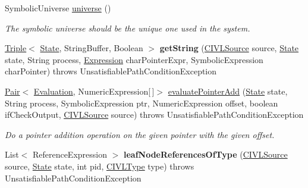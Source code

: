 \begin{DoxyCompactItemize}
Symbolic\+Universe \hyperlink{interfaceedu_1_1udel_1_1cis_1_1vsl_1_1civl_1_1semantics_1_1IF_1_1Evaluator_a0a9ac7185a439c0eb14ee08d6d9d1694}{universe} ()
\begin{DoxyCompactList}\small\item\em The symbolic universe should be the unique one used in the system. \end{DoxyCompactList}\item 
\hypertarget{interfaceedu_1_1udel_1_1cis_1_1vsl_1_1civl_1_1semantics_1_1IF_1_1Evaluator_a162e0e5ca97cb8387262320d948f6d7f}{}\hyperlink{classedu_1_1udel_1_1cis_1_1vsl_1_1civl_1_1util_1_1IF_1_1Triple}{Triple}$<$ \hyperlink{interfaceedu_1_1udel_1_1cis_1_1vsl_1_1civl_1_1state_1_1IF_1_1State}{State}, String\+Buffer, Boolean $>$ {\bfseries get\+String} (\hyperlink{interfaceedu_1_1udel_1_1cis_1_1vsl_1_1civl_1_1model_1_1IF_1_1CIVLSource}{C\+I\+V\+L\+Source} source, \hyperlink{interfaceedu_1_1udel_1_1cis_1_1vsl_1_1civl_1_1state_1_1IF_1_1State}{State} state, String process, \hyperlink{interfaceedu_1_1udel_1_1cis_1_1vsl_1_1civl_1_1model_1_1IF_1_1expression_1_1Expression}{Expression} char\+Pointer\+Expr, Symbolic\+Expression char\+Pointer)  throws Unsatisfiable\+Path\+Condition\+Exception\label{interfaceedu_1_1udel_1_1cis_1_1vsl_1_1civl_1_1semantics_1_1IF_1_1Evaluator_a162e0e5ca97cb8387262320d948f6d7f}

\item 
\hyperlink{classedu_1_1udel_1_1cis_1_1vsl_1_1civl_1_1util_1_1IF_1_1Pair}{Pair}$<$ \hyperlink{classedu_1_1udel_1_1cis_1_1vsl_1_1civl_1_1semantics_1_1IF_1_1Evaluation}{Evaluation}, Numeric\+Expression\mbox{[}$\,$\mbox{]}$>$ \hyperlink{interfaceedu_1_1udel_1_1cis_1_1vsl_1_1civl_1_1semantics_1_1IF_1_1Evaluator_a472056af07db8c828ad7a65de4e1e1a1}{evaluate\+Pointer\+Add} (\hyperlink{interfaceedu_1_1udel_1_1cis_1_1vsl_1_1civl_1_1state_1_1IF_1_1State}{State} state, String process, Symbolic\+Expression ptr, Numeric\+Expression offset, boolean if\+Check\+Output, \hyperlink{interfaceedu_1_1udel_1_1cis_1_1vsl_1_1civl_1_1model_1_1IF_1_1CIVLSource}{C\+I\+V\+L\+Source} source)  throws Unsatisfiable\+Path\+Condition\+Exception
\begin{DoxyCompactList}\small\item\em Do a pointer addition operation on the given pointer with the given offset. \end{DoxyCompactList}\item 
\hypertarget{interfaceedu_1_1udel_1_1cis_1_1vsl_1_1civl_1_1semantics_1_1IF_1_1Evaluator_ac953d8c9b3b4a1d5553ae28df823f157}{}List$<$ Reference\+Expression $>$ {\bfseries leaf\+Node\+References\+Of\+Type} (\hyperlink{interfaceedu_1_1udel_1_1cis_1_1vsl_1_1civl_1_1model_1_1IF_1_1CIVLSource}{C\+I\+V\+L\+Source} source, \hyperlink{interfaceedu_1_1udel_1_1cis_1_1vsl_1_1civl_1_1state_1_1IF_1_1State}{State} state, int pid, \hyperlink{interfaceedu_1_1udel_1_1cis_1_1vsl_1_1civl_1_1model_1_1IF_1_1type_1_1CIVLType}{C\+I\+V\+L\+Type} type)  throws Unsatisfiable\+Path\+Condition\+Exception\label{interfaceedu_1_1udel_1_1cis_1_1vsl_1_1civl_1_1semantics_1_1IF_1_1Evaluator_ac953d8c9b3b4a1d5553ae28df823f157}


\end{DoxyCompactItemize}
